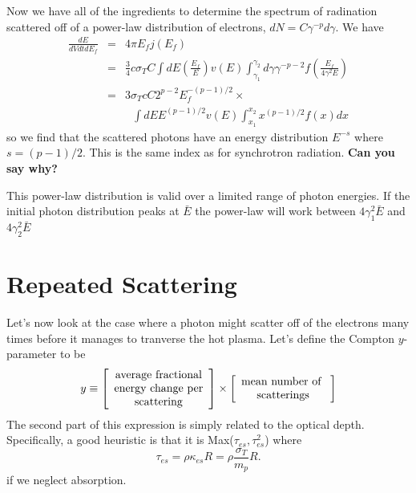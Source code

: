 Now we have all of the ingredients to determine the  spectrum
of radination scattered off of a power-law distribution of electrons,
$d N = C \gamma^{-p} d \gamma$.  We have
\begin{eqnarray}
\frac{d E}{dV dt dE_f} &=& 4 \pi E_f j(E_f) \\
&=& \frac{3}{4} c \sigma_T C \int d E \left ( \frac{E_f}{E} \right )  v(E)
\int_{\gamma_1}^{\gamma_2} d \gamma \gamma^{-p-2} f \left (
\frac{E_f}{4\gamma^2 E} \right ) \\
&=& 3\sigma_T c C 2^{p-2} E_f^{-(p-1)/2} \times \\ 
\nonumber & & ~~~\int d E E^{(p-1)/2} v(E)
\int_{x_1}^{x_2} x^{(p-1)/2} f(x) dx
\label{eq:430}
\end{eqnarray}
so we find that the scattered photons have an energy distribution
$E^{-s}$ where $s=(p-1)/2$.  This is the same index as for synchrotron
radiation. {\bf Can you say why?}

This power-law distribution is valid over a limited range of photon
energies.  If the initial photon distribution peaks at ${\bar E}$ the
power-law will work between $4 \gamma_1^2 {\bar E}$ and $4 \gamma_2^2
{\bar E}$

\section{Repeated Scattering}
\label{sec:repeated-scattering}

Let's now look at the case where a photon might scatter off of the
electrons many times before it manages to tranverse the hot plasma.
Let's define the Compton $y$-parameter to be
\begin{equation}
y \equiv \left [ \begin{array}{c}\hbox{\rm average fractional} \\
    \hbox{\rm energy change per} \\ \hbox{\rm scattering} \end{array} \right
] \times  \left [ \begin{array}{c}\hbox{\rm mean number of } \\
    \hbox{\rm scatterings} \end{array} \right] 
\label{eq:431}
\end{equation}
The second part of this expression is simply related to the optical
depth.  Specifically, a good heuristic is that it is
Max($\tau_{es},\tau_{es}^2$) where
\begin{equation}
\tau_{es} = \rho \kappa_{es} R = \rho \frac{\sigma_T}{m_p} R.
\label{eq:432}
\end{equation}
if we neglect absorption.

